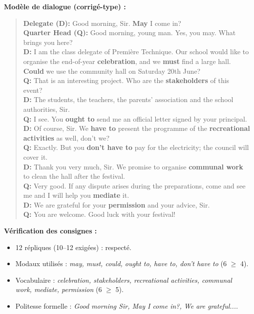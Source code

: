 \documentclass[11pt]{article}
\begin{document}
\begin{corrige}

\textbf{Modèle de dialogue (corrigé-type) :}

\begin{quote}
\textbf{Delegate (D):} Good morning, Sir. \textbf{May} I come in? \\
\textbf{Quarter Head (Q):} Good morning, young man. Yes, you may. What brings you here? \\
\textbf{D:} I am the class delegate of Première Technique. Our school would like to organise the end-of-year \textbf{celebration}, and we \textbf{must} find a large hall. \textbf{Could} we use the community hall on Saturday 20th June? \\
\textbf{Q:} That is an interesting project. Who are the \textbf{stakeholders} of this event? \\
\textbf{D:} The students, the teachers, the parents' association and the school authorities, Sir. \\
\textbf{Q:} I see. You \textbf{ought to} send me an official letter signed by your principal. \\
\textbf{D:} Of course, Sir. We \textbf{have to} present the programme of the \textbf{recreational activities} as well, don't we? \\
\textbf{Q:} Exactly. But you \textbf{don't have to} pay for the electricity; the council will cover it. \\
\textbf{D:} Thank you very much, Sir. We promise to organise \textbf{communal work} to clean the hall after the festival. \\
\textbf{Q:} Very good. If any dispute arises during the preparations, come and see me and I will help you \textbf{mediate} it. \\
\textbf{D:} We are grateful for your \textbf{permission} and your advice, Sir. \\
\textbf{Q:} You are welcome. Good luck with your festival!
\end{quote}

\textbf{Vérification des consignes :}
\begin{itemize}
\item 12 répliques (10--12 exigées) : respecté.
\item Modaux utilisés : \emph{may, must, could, ought to, have to, don't have to} (6 $\geq$ 4).
\item Vocabulaire : \emph{celebration, stakeholders, recreational activities, communal work, mediate, permission} (6 $\geq$ 5).
\item Politesse formelle : \emph{Good morning Sir, May I come in?, We are grateful...}.
\end{itemize}


\end{corrige}
\end{document}
